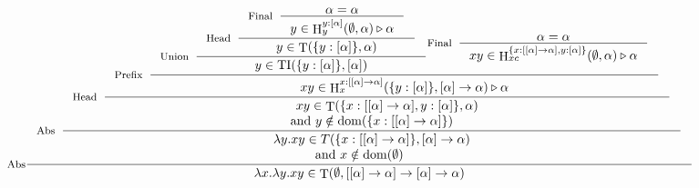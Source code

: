 \documentclass{beamer}
\DeclareMathOperator{\iT}{T}
\DeclareMathOperator{\iH}{H}
\DeclareMathOperator{\iTI}{TI}
\DeclareMathOperator{\iDom}{dom}
\begin{document}
    \begin{frame}
        \begin{displaymath}
        \makebox[\textwidth][c]{
            \inference[Abs]
            {\inference[Abs]
                {\inference[Head]
                    {\inference[Prefix]
                        {\inference[Union]
                            {\inference[Head]
                                {\inference[Final]
                                    {\alpha = \alpha}
                                    {y \in \iH^{y:[\alpha]}_y(\emptyset, \alpha) \triangleright \alpha}
                                }
                                {y \in \iT(\{y:[\alpha]\}, \alpha)}
                            }
                            {y \in \iTI(\{y:[\alpha]\}, [\alpha])}
                            \inference[Final]
                            {\alpha = \alpha}
                            {xy \in \iH^{\{x:[[\alpha]->\alpha], y : [\alpha]\}}_{xc}(\emptyset, \alpha) \triangleright \alpha}
                        }
                        {xy \in \iH^{x : [[\alpha] -> \alpha]}_x(\{y:[\alpha]\}, [\alpha] -> \alpha) \triangleright \alpha}
                    }
                    {xy \in \iT(\{x : [[\alpha] -> \alpha], y : [\alpha]\}, \alpha)} \\\text{and } y \notin \iDom(\{x : [[\alpha] -> \alpha]\})}
                {\lambda y.xy \in T(\{x : [[\alpha] -> \alpha]\}, [\alpha] -> \alpha)} \\\text{and } x \notin \iDom(\emptyset)}
            {\lambda x.\lambda y.xy \in \iT(\emptyset, [[\alpha] -> \alpha] -> [\alpha] -> \alpha)}
        }
        \end{displaymath}
    \end{frame}
    
    
\end{document}
